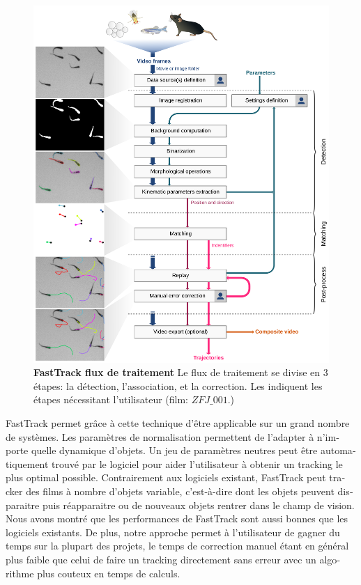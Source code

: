 \begin{otherlanguage}{french}
    \begin{figure}[h!]
      \centering
      \includegraphics[width=1\textwidth]{part_1/assets/Figure_1.png}
        \caption{{\bf FastTrack flux de traitement} Le flux de traitement se divise en 3 étapes: la détection, l'association, et la correction. Les \faUser indiquent les étapes nécessitant l'utilisateur (film: $ZFJ\_001$.)}
      \label{}
    \end{figure}

FastTrack permet grâce à cette technique d'être applicable sur un grand nombre de systèmes. Les paramètres de normalisation permettent de l'adapter à n'importe quelle dynamique d'objets. Un jeu de paramètres neutres peut être automatiquement trouvé par le logiciel pour aider l'utilisateur à obtenir un tracking le plus optimal possible. Contrairement aux logiciels existant, FastTrack peut tracker des films à nombre d'objets variable, c’est-à-dire dont les objets peuvent disparaitre puis réapparaitre ou de nouveaux objets rentrer dans le champ de vision. Nous avons montré que les performances de FastTrack sont aussi bonnes que les logiciels existants. De plus, notre approche permet à l'utilisateur de gagner du temps sur la plupart des projets, le temps de correction manuel étant en général plus faible que celui de faire un tracking directement sans erreur avec un algorithme plus couteux en temps de calculs.


\end{otherlanguage}

